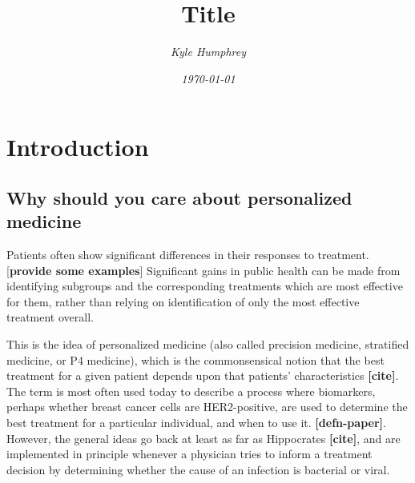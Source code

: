 \documentclass[12pt]{article}
\title{\normalfont \Large Title}
\author{\normalsize \sl Kyle Humphrey}
\date{\normalsize \sl \today}
\begin{document}
\maketitle

\section{Introduction}

\subsection{Why should you care about personalized medicine} %
\label{sub:why_should_you_care_about_personalized_medicine}



Patients often show significant differences in their responses to treatment. [\textbf{provide some examples}] Significant gains in public health can be made from identifying subgroups and the corresponding treatments which are most effective for them, rather than relying on identification of only the most effective treatment overall.

This is the idea of personalized medicine (also called precision medicine, stratified medicine, or P4 medicine), which is the commonsensical notion that the best treatment for a given patient depends upon that patients' characteristics \textbf{[cite]}. The term is most often used today to describe a process where biomarkers, perhaps whether breast cancer cells are HER2-positive, are used to determine the best treatment for a particular individual, and when to use it. \textbf{[defn-paper]}.
However, the general ideas go back at least as far as Hippocrates \textbf{[cite]}, and are implemented in principle whenever a physician tries to inform a treatment decision by determining whether the cause of an infection is bacterial or viral.

\end{document}
